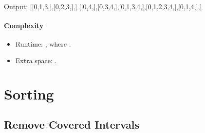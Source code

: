 \documentclass[letterpaper,12pt,english]{book}
\begin{document}
\begin{sphinxVerbatim}[commandchars=\\\{\}]
\end{sphinxVerbatim}

\begin{sphinxVerbatim}[commandchars=\\\{\}]
Output:
[[0,1,3,],[0,2,3,],]
[[0,4,],[0,3,4,],[0,1,3,4,],[0,1,2,3,4,],[0,1,4,],]
\end{sphinxVerbatim}


\subsubsection{Complexity}
\label{\detokenize{Graph/797_All_Paths_From_Source_to_Target:complexity}}\begin{itemize}
\item {} 
\sphinxAtStartPar
Runtime: , where .

\item {} 
\sphinxAtStartPar
Extra space: .

\end{itemize}

\sphinxstepscope


\chapter{Sorting}
\label{\detokenize{Sorting/index:sorting}}\label{\detokenize{Sorting/index::doc}}
\sphinxstepscope


\section{Remove Covered Intervals}
\label{\detokenize{Sorting/04_SORT_1288_Remove_Covered_Intervals:remove-covered-intervals}}\label{\detokenize{Sorting/04_SORT_1288_Remove_Covered_Intervals::doc}}
\end{document}
